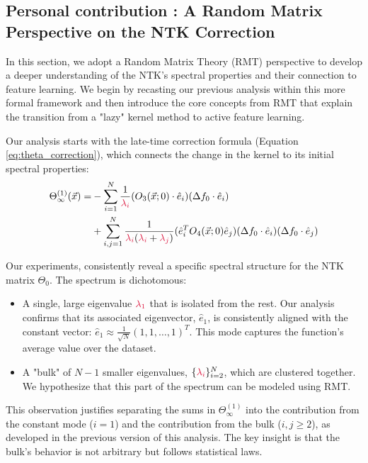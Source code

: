 \documentclass[a4paper]{article}
\theoremstyle{plain}
\theoremstyle{definition}
\theoremstyle{remark}
\begin{document}
\subsection{Personal contribution : A Random Matrix Perspective on the NTK Correction}

In this section, we adopt a Random Matrix Theory (RMT) perspective to develop a deeper understanding of the NTK's spectral properties and their connection to feature learning. We begin by recasting our previous analysis within this more formal framework and then introduce the core concepts from RMT that explain the transition from a "lazy" kernel method to active feature learning.

Our analysis starts with the late-time correction formula (Equation \ref{eq:theta_correction}), which connects the change in the kernel to its initial spectral properties:
\begin{align*}
\Theta^{(1)}_\infty(\vec{x}) = & -\sum_{i=1}^N \frac{1}{\textcolor{kernelcolor}{\lambda_{i}}}(O_{3}(\vec{x};0)\cdot\hat{e}_{i})(\Delta f_{0}\cdot\hat{e}_{i}) \\
& + \sum_{i,j=1}^N\frac{1}{\textcolor{kernelcolor}{\lambda_{i}}(\textcolor{kernelcolor}{\lambda_{i}}+\textcolor{kernelcolor}{\lambda_{j}})}(\hat{e}_{i}^{T}O_{4}(\vec{x};0)\hat{e}_{j})(\Delta f_{0}\cdot \hat{e}_{i})(\Delta f_{0}\cdot \hat{e}_{j})
\end{align*}



Our experiments, consistently reveal a specific spectral structure for the NTK matrix $\Theta_0$. The spectrum is dichotomous:
\begin{itemize}
    \item A single, large eigenvalue $\textcolor{kernelcolor}{\lambda_1}$ that is isolated from the rest. Our analysis confirms that its associated eigenvector, $\hat{e}_1$, is consistently aligned with the constant vector: $\hat{e}_1 \approx \frac{1}{\sqrt{N}}(1, 1, \dots, 1)^T$. This mode captures the function's average value over the dataset.
    \item A "bulk" of $N-1$ smaller eigenvalues, $\{\textcolor{kernelcolor}{\lambda_i}\}_{i=2}^N$, which are clustered together. We hypothesize that this part of the spectrum can be modeled using RMT.
\end{itemize}
This observation justifies separating the sums in $\Theta^{(1)}_\infty$ into the contribution from the constant mode ($i=1$) and the contribution from the bulk ($i,j \ge 2$), as developed in the previous version of this analysis. The key insight is that the bulk's behavior is not arbitrary but follows statistical laws.
\end{document}
